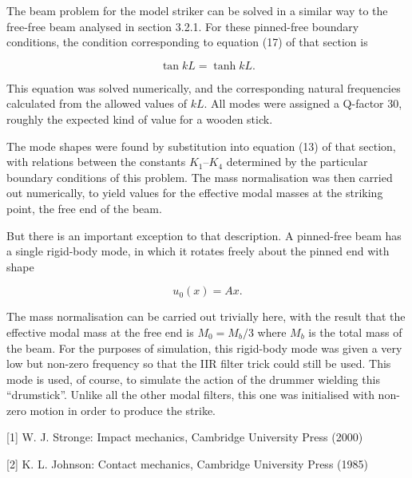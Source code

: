   The beam problem for the model striker can be solved in a similar way to the 
  free-free beam analysed in section 3.2.1. For these pinned-free boundary 
  conditions, the condition corresponding to equation (17) of that section is 

  $$\tan kL = \tanh kL . \tag{11}$$ 

  This equation was solved numerically, and the corresponding natural 
  frequencies calculated from the allowed values of $kL$. All modes were 
  assigned a Q-factor 30, roughly the expected kind of value for a wooden 
  stick. 

  The mode shapes were found by substitution into equation (13) of that 
  section, with relations between the constants $K_1$--$K_4$ determined by the 
  particular boundary conditions of this problem. The mass normalisation was 
  then carried out numerically, to yield values for the effective modal masses 
  at the striking point, the free end of the beam. 

  But there is an important exception to that description. A pinned-free beam 
  has a single rigid-body mode, in which it rotates freely about the pinned end 
  with shape 

  $$u_0(x)=A x . \tag{12}$$ 

  The mass normalisation can be carried out trivially here, with the result 
  that the effective modal mass at the free end is $M_0=M_b/3$ where $M_b$ is 
  the total mass of the beam. For the purposes of simulation, this rigid-body 
  mode was given a very low but non-zero frequency so that the IIR filter trick 
  could still be used. This mode is used, of course, to simulate the action of 
  the drummer wielding this ``drumstick''. Unlike all the other modal filters, 
  this one was initialised with non-zero motion in order to produce the strike. 

  \sectionreferences{}[1] W. J. Stronge: Impact mechanics, Cambridge University 
  Press (2000) 

  [2] K. L. Johnson: Contact mechanics, Cambridge University Press (1985) 